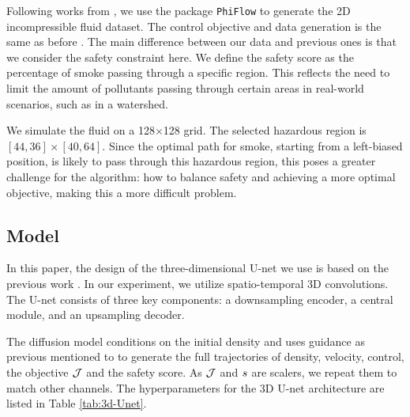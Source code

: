 Following works from \citet{holl2020learning, wei2024generative, hu2024wavelet}, we use the package \texttt{PhiFlow} to generate the 2D incompressible fluid dataset. The control objective and data generation is the same as before \citep{wei2024generative}. The main difference between our data and previous ones is that we consider the safety constraint here. We define the safety score as the percentage of smoke passing through a specific region. This reflects the need to limit the amount of pollutants passing through certain areas in real-world scenarios, such as in a watershed.

We simulate the fluid on a 128$\times$128 grid. The selected hazardous region is \([44, 36] \times [40, 64]\). Since the optimal path for smoke, starting from a left-biased position, is likely to pass through this hazardous region, this poses a greater challenge for the algorithm: how to balance safety and achieving a more optimal objective, making this a more difficult problem.

\subsection{Model}
In this paper, the design of the three-dimensional U-net we use is based on the previous work \citep{ho2022video}. In our experiment, we utilize spatio-temporal 3D convolutions. The U-net consists of three key components: a downsampling encoder, a central module, and an upsampling decoder.

The diffusion model conditions on the initial density and uses guidance as previous mentioned to to generate the full trajectories of density, velocity, control, the objective $\mathcal{J}$ and the safety score. As $\mathcal{J}$ and $s$ are scalers, we repeat them to match other channels. The hyperparameters for the 3D U-net architecture are listed in Table \ref{tab:3d-Unet}.

